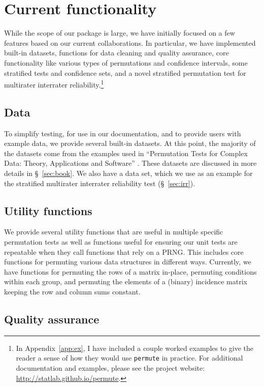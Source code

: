 \chapter{\label{ch:func}Current functionality}

While the scope of our package is large, we have initially focused on a few
features based on our current collaborations.  In particular, we have
implemented built-in datasets, functions for data cleaning and quality
assurance, core functionality like various types of permutations and confidence
intervals, some stratified tests and confidence sets, and a novel stratified
permutation test for multirater interrater reliability.\footnote{In
Appendix~\ref{app:ex}, I have included a couple worked examples to give the
reader a sense of how they would use \texttt{permute} in practice.  For
additional documentation and examples, please see the project website:
\url{http://statlab.github.io/permute}.}

\section{Data}

To simplify testing, for use in our documentation, and to provide users with
example data, we provide several built-in datasets. At this point, the majority
of the datasets come from the examples used in ``Permutation Tests for Complex
Data: Theory, Applications and Software'' \cite{pesarin2010permutation}.  These
datasets are discussed in more details in \S~\ref{sec:book}.  We also have a
data set, which we use as an example for the stratified multirater interrater
reliability test (\S~\ref{sec:irr}).

\section{Utility functions}

We provide several utility functions that are useful in multiple specific
permutation tests as well as functions useful for ensuring our unit tests are
repeatable when they call functions that rely on a PRNG.  This includes core
functions for permuting various data structures in different ways.  Currently,
we have functions for permuting the rows of a matrix in-place, permuting
conditions within each group, and permuting the elements of a (binary)
incidence matrix keeping the row and column sums constant.


\section{Quality assurance}


